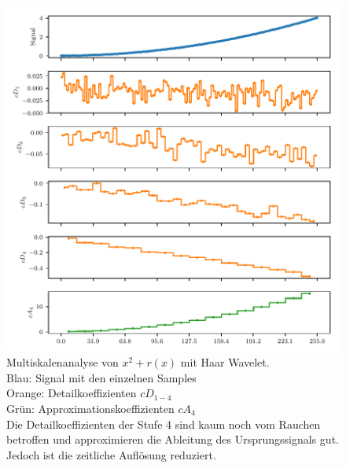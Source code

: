\begin{refsection}
\begin{figure}
    \centering
    \includegraphics{papers/polynomials/images/polynomials_noise_db1_multi.pdf}
    \caption{Multiskalenanalyse von $x^2 + r(x)$ mit Haar Wavelet.\\
        Blau: Signal mit den einzelnen Samples\\
        Orange: Detailkoeffizienten $cD_{1-4}$ \\
        Grün: Approximationskoeffizienten $cA_4$\\
        Die Detailkoeffizienten der Stufe 4 sind kaum noch vom Rauchen
        betroffen und approximieren die Ableitung des Ursprungssignals gut.
        Jedoch ist die zeitliche Auflösung reduziert.\label{polynomials:noise:db1_multi}}
\end{figure}
\begin{figure}
    \centering

\end{figure}
\end{refsection}
